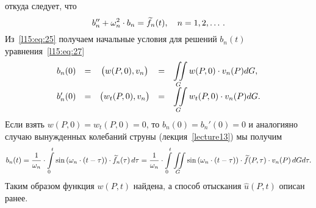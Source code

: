 откуда следует, что 
\begin{equation}\label{l15:eq:27}
	\hfill b_n''+\omega_n^2\cdot b_n=\widetilde{f}_n(t),\quad n=1,2,\ldots\,.\hfill
\end{equation}
Из~\eqref{l15:eq:25} получаем начальные условия для решений $b_n(t)$ уравнения~\eqref{l15:eq:27}
\begin{equation*}
	\hfill\begin{array}{rcccl}
		b_n(0)&=&\big(w(P,0),v_n\big)&=&\displaystyle\iint\limits_{G}w(P,0)\cdot v_n(P)dG,\\
		b'_n(0)&=&\big(w_t(P,0),v_n\big)&=&\displaystyle\iint\limits_{G}w_t(P,0)\cdot v_n(P)dG.
	\end{array}\hfill
\end{equation*}
Если взять $w(P,0)=w_t(P,0)=0$, то $b_n(0)=b_n'(0)=0$ и аналогияно случаю вынужденных колебаний струны (лекция~\ref{lecture13}) мы получим 
\begin{equation*}
	\hfill b_n(t)=\frac{1}{\omega_n}\cdot\int\limits_0^t\sin\left(\omega_n\cdot(t-\tau)\right)\cdot\widetilde{f}_n(\tau)\,d\tau=\frac{1}{\omega_n}\cdot\int\limits_0^t\iint\limits_{G}\sin\left(\omega_n\cdot(t-\tau)\right)\cdot\widetilde{f}(P,\tau)\cdot v_n(P)\,dGd\tau.\hfill
\end{equation*}
Таким образом функция $w(P,t)$ найдена, а способ отыскания $\widehat{u}(P,t)$ описан ранее.